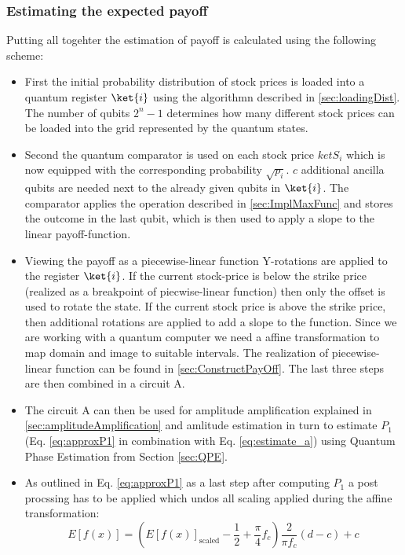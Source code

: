 \documentclass[../../main.tex]{subfiles}
\begin{document}
\subsubsection{Estimating the expected payoff}
Putting all togehter the estimation of payoff is calculated using the following scheme:
\begin{itemize}
  \item First the initial probability distribution of stock prices is loaded into a quantum register $\ket{i}$ using
  the algorithmn described in \ref{sec:loadingDist}. The number of qubits $2^n-1$ determines how many different stock prices can be loaded into the grid represented by the quantum states.
  \item Second the quantum comparator is used on each stock price $ket{S_i}$ which is now equipped with the corresponding probability $\sqrt{p_i}$. $c$ additional ancilla qubits are needed next to the already given qubits in $\ket{i}$.
  The comparator applies the operation described in \ref{sec:ImplMaxFunc} and stores the outcome in the last qubit, which is then used to apply a slope to the linear payoff-function.
  \item Viewing the payoff as a piecewise-linear function Y-rotations are applied to the register $\ket{i}$. If the current stock-price is below the strike price (realized as a breakpoint of piecwise-linear function)
  then only the offset is used to rotate the state. If the current stock price is above the strike price, then additional rotations are applied to add a slope to the function. Since we are working with a quantum computer we need a affine transformation
  to map domain and image to suitable intervals. The realization of piecewise-linear function can be found in \ref{sec:ConstructPayOff}. The last three steps are then combined in a circuit A.
  \item The circuit A can then be used for amplitude amplification explained in \ref{sec:amplitudeAmplification} and amlitude estimation in turn to estimate $P_1$ (Eq. \ref{eq:approxP1} in combination with Eq. \ref{eq:estimate_a}) using Quantum Phase Estimation from Section \ref{sec:QPE}.
  \item As outlined in Eq. \ref{eq:approxP1} as a last step after computing $P_1$ a post procssing has to be applied which undos all scaling applied during the affine transformation: 
  \begin{equation}
    E[f(x)]  = ( E[f(x)]_{\text{scaled}} - \frac{1}{2} + \frac{\pi}{4}f_c ) \frac{2}{\pi f_c} (d-c) + c
  \end{equation}
\end{itemize}
\biblio
\end{document}
